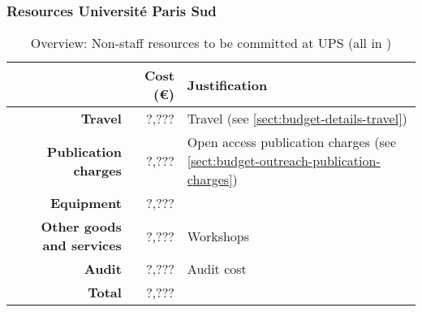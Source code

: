 %
%
%
%
%
%

\subsubsection{Resources Universit\'{e} Paris Sud}




\bigskip
\begin{table}[H]
\begin{tabular}{|r|r|p{9cm}|}
\hline
\textbf{} & \textbf{Cost (\euro)} & \textbf{Justification} \\\hline
\textbf{Travel} & ?,??? & Travel (see \ref{sect:budget-details-travel})\\\hline
\textbf{Publication charges} & ?,??? & Open access publication charges (see \ref{sect:budget-outreach-publication-charges})\\\hline
\textbf{Equipment} & ?,??? &  \\\hline    %

\textbf{Other goods and services} & ?,??? & Workshops \\\hline   %
\textbf{Audit} & ?,??? & Audit cost \\\hline
\textbf{Total} & ?,???\\\cline{1-2}
\end{tabular}
\caption{Overview: Non-staff resources to be committed at UPS (all in \texteuro)}\vspace*{-1em}
\end{table}



